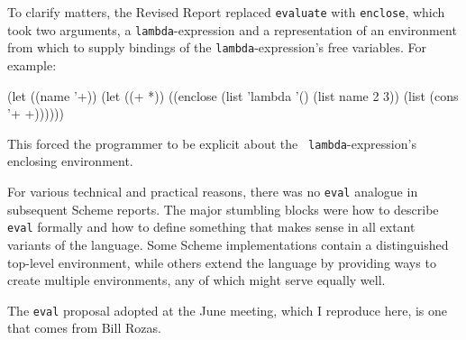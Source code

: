 To clarify matters, the Revised Report replaced {\tt evaluate} with
{\tt enclose}, which took two arguments, a {\tt lambda}-expression and
a representation of an environment from which to supply bindings of the
{\tt lambda}-expression's free variables.  For example:
\begin{code}
    (let ((name '+))
      (let ((+ *))
        ((enclose (list 'lambda '() (list name 2 3))
                  (list (cons '+ +))))))
\end{code}
This forced the programmer to be explicit about the {\tt
lambda}-expression's enclosing environment.

For various technical and practical reasons, there was no {\tt eval}
analogue in subsequent Scheme reports.  The major stumbling blocks
were how to describe {\tt eval} formally and how to define something
that makes sense in all extant variants of the language.  Some Scheme
implementations contain a distinguished top-level environment, while
others extend the language by providing ways to create multiple
environments, any of which might serve equally well.

The {\tt eval} proposal adopted at the June meeting, which I reproduce
here, is one that comes from Bill Rozas.

